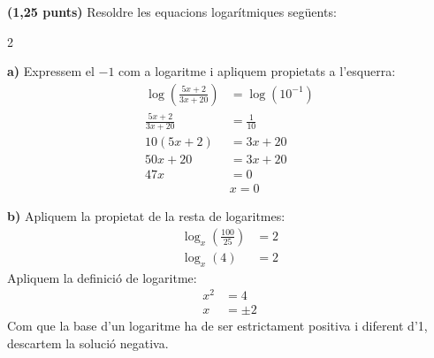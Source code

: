\documentclass[12pt,a4paper]{exam}
\begin{document}
\begin{questions}
\question \textbf{(1,25 punts)} Resoldre les equacions logarítmiques següents:
\begin{multicols}{2}
\end{multicols}
\begin{solution}
    \textbf{a)} Expressem el $-1$ com a logaritme i apliquem propietats a l'esquerra:
    \begin{align*}
        \log\left(\frac{5x+2}{3x+20}\right) &= \log(10^{-1}) \\
        \frac{5x+2}{3x+20} &= \frac{1}{10} \\
        10(5x+2) &= 3x+20 \\
        50x + 20 &= 3x + 20 \\
        47x &= 0 \\
        &\boxed{x = 0}
    \end{align*}
    
    \textbf{b)} Apliquem la propietat de la resta de logaritmes:
    \begin{align*}
        \log_x\left(\frac{100}{25}\right) &= 2 \\
        \log_x(4) &= 2
    \end{align*}
    Apliquem la definició de logaritme:
    \begin{align*}
        x^2 &= 4 \\
        x &= \pm 2
    \end{align*}
    Com que la base d'un logaritme ha de ser estrictament positiva i diferent d'1, descartem la solució negativa. \\
    \vspace{0.3cm}
    \indent {}
\end{solution}

\end{questions}
\end{document}
